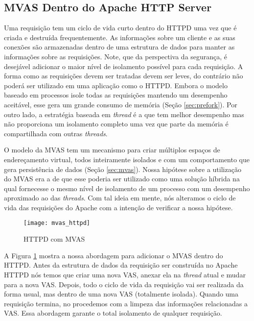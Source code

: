\subsection{MVAS Dentro do Apache HTTP Server}

Uma requisição tem um ciclo de vida curto dentro do HTTPD uma vez que é criada
e destruída frequentemente. As informações sobre um cliente e as suas conexões
são armazenadas dentro de uma estrutura de dados para manter as informações
sobre as requisições. Note, que da perspectiva da segurança, é desejável
adicionar o maior nível de isolamento possível para cada requisição. A forma
como as requisições devem ser tratadas devem ser leves, do contrário não poderá
ser utilizado em uma aplicação como o HTTPD. Embora o modelo baseado em
processos isole todas as requisições mantendo um desempenho aceitável, esse
gera um grande consumo de memória (Seção \ref{sec:prefork}).  Por outro lado, a
estratégia baseada em \emph{thread} é a que tem melhor desempenho mas não
proporciona um isolamento completo uma vez que parte da memória é compartilhada
com outras \emph{threads}.

O modelo da MVAS tem um mecanismo para criar múltiplos espaços de endereçamento
virtual, todos inteiramente isolados e com um comportamento que gera
persistência de dados (Seção \ref{sec:mvas}). Nossa hipótese sobre a utilização
do MVAS era a de que esse poderia ser utilizado como uma solução híbrida na
qual fornecesse o mesmo nível de isolamento de um processo com um desempenho
aproximado ao das \emph{threads}. Com tal ideia em mente, nós alteramos o ciclo
de vida das requisições do Apache com a intenção de verificar a nossa hipótese.

\begin{figure}[!h]
  \centering
  \texttt{[image: mvas\_httpd]}
  
  \caption{HTTPD com MVAS}
  \label{fig:httpd_mvas}
\end{figure}

A Figura \ref{fig:httpd_mvas} mostra a nossa abordagem para adicionar o MVAS
dentro do HTTPD. Antes da estrutura de dados da requisição ser construída no
Apache HTTPD nós temos que criar uma nova VAS, anexar ela na \emph{thread}
atual e mudar para a nova VAS. Depois, todo o ciclo de vida da requisição vai
ser realizada da forma usual, mas dentro de uma nova VAS (totalmente isolada).
Quando uma requisição termina, no procedemos com a limpeza das informações
relacionadas a VAS. Essa abordagem garante o total isolamento de qualquer
requisição.

